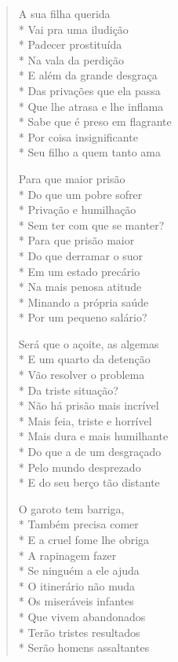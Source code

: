 \begin{verse}
A sua filha querida\\*
Vai pra uma iludição\\*
Padecer prostituída\\*
Na vala da perdição\\*
E além da grande desgraça\\*
Das privações que ela passa\\*
Que lhe atrasa e lhe inflama\\*
Sabe que é preso em flagrante\\*
Por coisa insignificante\\*
Seu filho a quem tanto ama

Para que maior prisão\\*
Do que um pobre sofrer\\*
Privação e humilhação\\*
Sem ter com que se manter?\\*
Para que prisão maior\\*
Do que derramar o suor\\*
Em um estado precário\\*
Na mais penosa atitude\\*
Minando a própria saúde\\*
Por um pequeno salário?

Será que o açoite, as algemas\\*
E um quarto da detenção\\*
Vão resolver o problema\\*
Da triste situação?\\*
Não há prisão mais incrível\\*
Mais feia, triste e horrível\\*
Mais dura e mais humilhante\\*
Do que a de um desgraçado\\*
Pelo mundo desprezado\\*
E do seu berço tão distante

O garoto tem barriga,\\*
Também precisa comer\\*
E a cruel fome lhe obriga\\*
A rapinagem fazer\\*
Se ninguém a ele ajuda\\*
O itinerário não muda\\*
Os miseráveis infantes\\*
Que vivem abandonados\\*
Terão tristes resultados\\*
Serão homens assaltantes


\end{verse}
